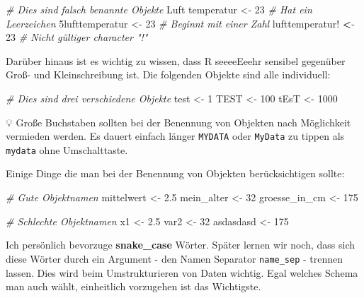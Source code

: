 \documentclass[
]{article}
\newenvironment{Shaded}{\begin{snugshade}}{\end{snugshade}}
\newcommand{\CommentTok}[1]{\textcolor[rgb]{0.56,0.35,0.01}{\textit{#1}}}
\newcommand{\DecValTok}[1]{\textcolor[rgb]{0.00,0.00,0.81}{#1}}
\newcommand{\ErrorTok}[1]{\textcolor[rgb]{0.64,0.00,0.00}{\textbf{#1}}}
\newcommand{\FloatTok}[1]{\textcolor[rgb]{0.00,0.00,0.81}{#1}}
\newcommand{\NormalTok}[1]{#1}
\newcommand{\OtherTok}[1]{\textcolor[rgb]{0.56,0.35,0.01}{#1}}
\newcommand{\SpecialCharTok}[1]{\textcolor[rgb]{0.00,0.00,0.00}{#1}}
\begin{document}
\begin{Shaded}
\begin{Highlighting}[]
\CommentTok{\# Dies sind falsch benannte Objekte}
\NormalTok{Luft temperatur }\OtherTok{\textless{}{-}} \DecValTok{23} \CommentTok{\# Hat ein Leerzeichen}
\NormalTok{5lufttemperatur }\OtherTok{\textless{}{-}} \DecValTok{23} \CommentTok{\# Beginnt mit einer Zahl}
\NormalTok{lufttemperatur}\SpecialCharTok{!} \ErrorTok{\textless{}}\SpecialCharTok{{-}} \DecValTok{23} \CommentTok{\# Nicht gültiger character "!"}
\end{Highlighting}
\end{Shaded}

Darüber hinaus ist es wichtig zu wissen, dass R seeeeEeehr sensibel gegenüber Groß- und Kleinschreibung ist. Die folgenden Objekte sind alle individuell:

\begin{Shaded}
\begin{Highlighting}[]
\CommentTok{\# Dies sind drei verschiedene Objekte}
\NormalTok{test }\OtherTok{\textless{}{-}} \DecValTok{1}
\NormalTok{TEST }\OtherTok{\textless{}{-}} \DecValTok{100}
\NormalTok{tEsT }\OtherTok{\textless{}{-}} \DecValTok{1000}
\end{Highlighting}
\end{Shaded}

💡 Große Buchstaben sollten bei der Benennung von Objekten nach Möglichkeit vermieden werden. Es dauert einfach länger \texttt{MYDATA} oder \texttt{MyData} zu tippen als \texttt{mydata} ohne Umschalttaste.

Einige Dinge die man bei der Benennung von Objekten berücksichtigen sollte:

\begin{Shaded}
\begin{Highlighting}[]
\CommentTok{\# Gute Objektnamen}
\NormalTok{mittelwert }\OtherTok{\textless{}{-}} \FloatTok{2.5}
\NormalTok{mein\_alter }\OtherTok{\textless{}{-}} \DecValTok{32}
\NormalTok{groesse\_in\_cm }\OtherTok{\textless{}{-}} \DecValTok{175}

\CommentTok{\# Schlechte Objektnamen}
\NormalTok{x1 }\OtherTok{\textless{}{-}} \FloatTok{2.5}
\NormalTok{var2 }\OtherTok{\textless{}{-}} \DecValTok{32}
\NormalTok{asdasdasd }\OtherTok{\textless{}{-}} \DecValTok{175}
\end{Highlighting}
\end{Shaded}

Ich persönlich bevorzuge \textbf{snake\_case} Wörter. Später lernen wir noch, dass sich diese Wörter durch ein Argument - den Namen Separator \texttt{name\_sep} - trennen lassen. Dies wird beim Umstrukturieren von Daten wichtig. Egal welches Schema man auch wählt, einheitlich vorzugehen ist das Wichtigste.
\end{document}

